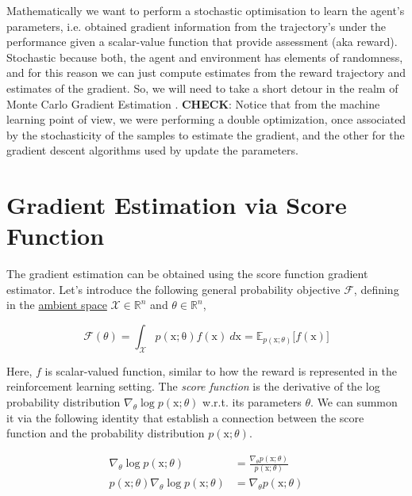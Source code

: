 Mathematically we want to perform a stochastic optimisation to learn the agent's parameters, i.e. obtained gradient information from the trajectory's under the performance given a scalar-value function that provide assessment (aka reward). Stochastic because both, the agent and environment has elements of randomness, and for this reason we can just compute estimates from the reward trajectory and estimates of the gradient. So, we will need to take a short detour in the realm of Monte Carlo Gradient Estimation \citep{mohamed2020monte}. \textbf{CHECK}: Notice that from the machine learning point of view, we were performing a double optimization, once associated by the stochasticity of the samples to estimate the gradient, and the other for the gradient descent algorithms used by update the parameters.

\section{Gradient Estimation via Score Function}

The gradient estimation can be obtained using the score function gradient estimator. Let's introduce the following general probability objective $\mathcal{F}$, defining in the \href{https://en.wikipedia.org/wiki/Ambient_space_(mathematics)}{ambient space} $\mathcal{X}\in\mathbb{R}^n$ and $\theta\in\mathbb{R}^n$,

\begin{equation}\label{eqn:probability-objective}
\mathcal{F}(\theta) = \int_{\mathcal{X}} p(\mathrm{x; \theta})f(\mathrm{x})~d\mathrm{x} = \mathbb{E}_{p(\mathrm{x};\theta)}\big[f(\mathrm{x})\big]
\end{equation}

Here, $f$ is scalar-valued function, similar to how the reward is represented
in the reinforcement learning setting. The \textit{score function} is the derivative of
the log probability distribution $\nabla_{\theta}\log p(\mathrm{x};\theta)$ w.r.t. its parameters $\theta$. We
can summon it via the following identity that establish a connection between
the score function and the probability distribution $p(\mathrm{x};\theta)$.

\begin{equation}\label{eqn:log-derivative-trick-expression}
    \begin{split}
        \nabla_\theta\log p(\mathrm{x};\theta) &= \frac{\nabla_{\theta}p(\mathrm{x}; \theta)}{p(\mathrm{x};\theta)} \\
        p(\mathrm{x};\theta) \nabla_{\theta}\log p(\mathrm{x};\theta) &= \nabla_{\theta}p(\mathrm{x};\theta)
    \end{split}
\end{equation}

